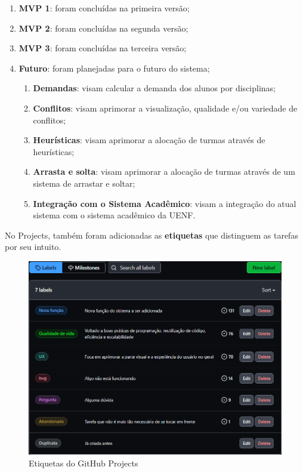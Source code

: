 \begin{enumerate}
  \item \textbf{MVP 1}: foram concluídas na primeira versão;
  \item \textbf{MVP 2}: foram concluídas na segunda versão;
  \item \textbf{MVP 3}: foram concluídas na terceira versão;
  \item \textbf{Futuro}: foram planejadas para o futuro do sistema;
        \begin{enumerate}
          \item \textbf{Demandas}: visam calcular a demanda dos alunos por disciplinas;
          \item \textbf{Conflitos}: visam aprimorar a visualização, qualidade e/ou variedade de conflitos;
          \item \textbf{Heurísticas}: visam aprimorar a alocação de turmas através de heurísticas;
          \item \textbf{Arrasta e solta}: visam aprimorar a alocação de turmas através de um sistema de arrastar e soltar;
          \item \textbf{Integração com o Sistema Acadêmico}: visam a integração do atual sistema com o sistema acadêmico da UENF.
        \end{enumerate}
\end{enumerate}

No Projects, também foram adicionadas as \textbf{etiquetas} que distinguem as tarefas por seu intuito.

\begin{figure}[htbp]
  \centering
  \caption{Etiquetas do GitHub Projects\label{fig:ProjectsLabels}}
  \includegraphics[scale=0.6]{files/img/Codificacao/GitHubProjects - Labels.png}
  \legend{\selfAuthor}
\end{figure}

